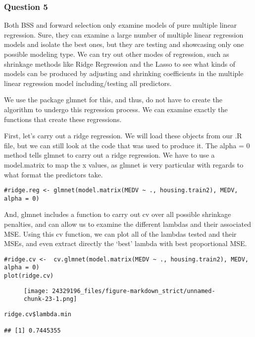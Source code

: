 \documentclass[]{article}
\begin{document}
\subsubsection{Question 5}\label{question-5}

Both BSS and forward selection only examine models of pure multiple
linear regression. Sure, they can examine a large number of multiple
linear regression models and isolate the best ones, but they are testing
and showcasing only one possible modeling type. We can try out other
modes of regression, such as shrinkage methods like Ridge Regression and
the Lasso to see what kinds of models can be produced by adjusting and
shrinking coefficients in the multiple linear regression model
including/testing all predictors.

We use the package glmnet for this, and thus, do not have to create the
algorithm to undergo this regression process. We can examine exactly the
functions that create these regressions.

First, let's carry out a ridge regression. We will load these objects
from our .R file, but we can still look at the code that was used to
produce it. The alpha = 0 method tells glmnet to carry out a ridge
regression. We have to use a model.matrix to map the x values, as glmnet
is very particular with regards to what format the predictors take.

\begin{verbatim}
#ridge.reg <- glmnet(model.matrix(MEDV ~ ., housing.train2), MEDV, alpha = 0)
\end{verbatim}

And, glmnet includes a function to carry out cv over all possible
shrinkage penalties, and can allow us to examine the different lambdas
and their associated MSE. Using this cv function, we can plot all of the
lambdas tested and their MSEs, and even extract directly the `best'
lambda with best proportional MSE.

\begin{verbatim}
#ridge.cv <-  cv.glmnet(model.matrix(MEDV ~ ., housing.train2), MEDV, alpha = 0)
plot(ridge.cv)
\end{verbatim}

\begin{figure}[htbp]
\centering
\texttt{[image: 24329196\_files/figure-markdown\_strict/unnamed-chunk-23-1.png]}
\end{figure}

\begin{verbatim}
ridge.cv$lambda.min

## [1] 0.7445355
\end{verbatim}
\end{document}
